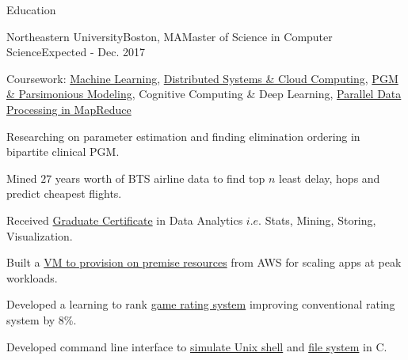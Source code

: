 \documentclass{resume} %
\begin{document}

\begin{rSection}{Education}

\begin{rSubsection}{Northeastern University}{Boston, MA}{Master of Science in Computer Science}{Expected - Dec. 2017}
\item Coursework: \href{http://www.ccs.neu.edu/home/vip/teach/MLcourse/html/}{Machine Learning}, \href{https://okrieg.github.io/EC500/index-spring-2016.html}{Distributed Systems \& Cloud Computing}, \href{http://www.ccs.neu.edu/home/eelhami/courses_nu_cs7180.htm}{PGM \& Parsimonious \mbox{Modeling}}, Cognitive Computing \& Deep Learning, \href{http://www.ccs.neu.edu/home/mirek/classes/2012-F-CS6240/}{Parallel Data Processing in MapReduce}
\item Researching on parameter estimation and finding elimination ordering in bipartite clinical PGM.
\item Mined $27$ years worth of BTS airline data to find top $n$ least delay, hops and predict cheapest flights.
\item Received \href{http://www.northeastern.edu/data-analytics/data-science-certificate/}{Graduate Certificate} in Data Analytics $i.e.$ Stats, Mining, Storing, Visualization.
\item Built a \href{https://github.com/singhay/ms-courses-code/tree/master/CS7680-Cloud-Computing-Distributed-Systems}{VM to provision on premise resources} from AWS for scaling apps at peak workloads.
\item Developed a learning to rank \href{https://github.com/singhay/ms-courses-code/tree/master/CS6140-Machine-Learning}{game rating system} improving conventional rating system by 8\%.
\item Developed command line interface to \href{https://github.com/singhay/ms-courses-code/tree/master/CS5600-Computer-Systems/team-05-hw1-master}{simulate Unix shell} and \href{https://github.com/singhay/ms-courses-code/tree/master/CS5600-Computer-Systems/team-05-hw2-master}{file system} in C.
\end{rSubsection}


\end{rSection}
\end{document}
